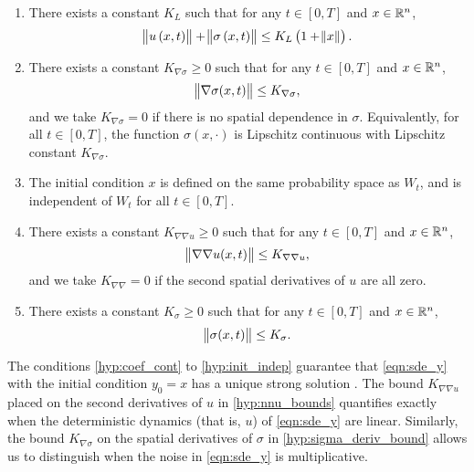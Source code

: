\begin{hypo}
\begin{enumerate}[label=(H.\arabic{*}), ref=H.\arabic{*}]
		\item\label{hyp:linear_growth} There exists a constant \(K_L\) such that for any \(t \in [0,T]\) and \(x \in \mathbb{R}^n\),
		\[
			\norm{u\left(x,t\right)} + \norm{\sigma\left(x,t\right)} \leq K_L\left(1 + \norm{x}\right).
		\]

		\item\label{hyp:sigma_deriv_bound} There exists a constant \(K_{\nabla\sigma} \geq 0\) such that for any \(t \in [0,T]\) and \(x \in \mathbb{R}^n\),
		\begin{equation*}
			\norm{\nabla\sigma(x,t)} \leq K_{\nabla\sigma},
		\end{equation*}
		and we take \(K_{\nabla\sigma} = 0\) if there is no spatial dependence in \(\sigma\).
		Equivalently, for all \(t \in [0,T]\), the function \(\sigma\!\left(x, \cdot\right)\) is Lipschitz continuous with Lipschitz constant \(K_{\nabla\sigma}\).

		\item\label{hyp:init_indep} The initial condition \(x\) is defined on the same probability space as \(W_t\), and is independent of \(W_t\) for all \(t \in [0,T]\).

		\item\label{hyp:nnu_bounds} There exists a constant \(K_{\nabla\nabla u} \geq 0\) such that for any \(t \in [0,T]\) and \(x \in \mathbb{R}^n\),
		\[
			\norm{\nabla \nabla u(x,t)} \leq K_{\nabla\nabla u},
		\]
		and we take \(K_{\nabla\nabla} = 0\) if the second spatial derivatives of \(u\) are all zero.

		\item\label{hyp:sigma_bounds} There exists a constant \(K_\sigma \geq 0\) such that for any \(t \in [0,T]\) and \(x \in \mathbb{R}^n\),
		\begin{equation*}
			\norm{\sigma(x,t)} \leq K_{\sigma}.
		\end{equation*}

	\end{enumerate}
\end{hypo}
The conditions \ref{hyp:coef_cont} to \ref{hyp:init_indep} guarantee that \cref{eqn:sde_y} with the initial condition \(y_0 = x\) has a unique strong solution \citep{KallianpurSundar_2014_StochasticAnalysisDiffusion}.
The bound \(K_{\nabla\nabla u}\) placed on the second derivatives of \(u\) in \ref{hyp:nnu_bounds} quantifies exactly when the deterministic dynamics (that is, \(u\)) of \cref{eqn:sde_y} are linear.
Similarly, the bound \(K_{\nabla\sigma}\) on the spatial derivatives of \(\sigma\) in \ref{hyp:sigma_deriv_bound} allows us to distinguish when the noise in \cref{eqn:sde_y} is multiplicative.

